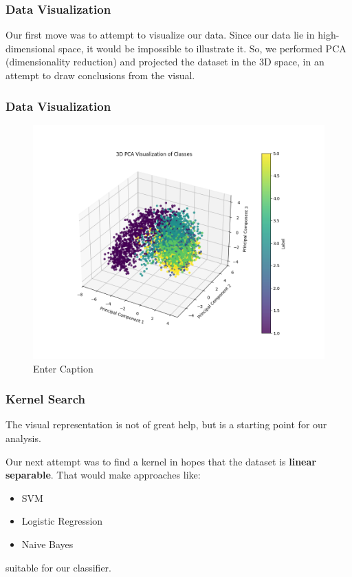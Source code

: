 \documentclass{beamer}
\begin{document}
\begin{frame}
\frametitle{Data Visualization}
Our first move was to attempt to visualize our data. Since our data lie in high-dimensional space, it would be impossible to illustrate it. So, we performed PCA (dimensionality reduction) and projected the dataset in the 3D space, in an attempt to draw conclusions from the visual. 
\end{frame}

\begin{frame}
\frametitle{Data Visualization}
\begin{figure}
    \centering
    \includegraphics[width=1\linewidth]{assets/datasetTV.png}
    \caption{Enter Caption}
    \label{fig:enter-label}
\end{figure}
\end{frame}

\begin{frame}
\frametitle{Kernel Search}
The visual representation is not of great help, but is a starting point for our analysis. 

Our next attempt was to find a kernel in hopes that the dataset is \textbf{linear separable}. That would make approaches like:
\begin{itemize}
    \item SVM
    \item Logistic Regression
    \item Naive Bayes
\end{itemize}
suitable for our classifier.
\end{frame}
\end{document}
